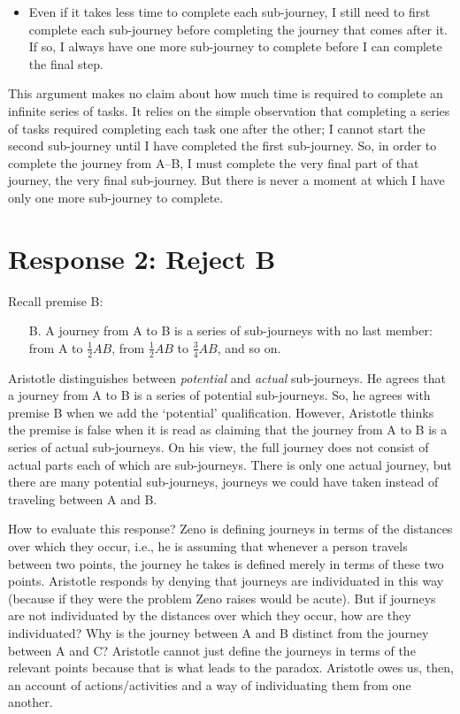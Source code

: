 \documentclass[oneside]{article}
\begin{document}
\begin{itemize}
\itemsep1pt\parskip0pt
\item
  Even if it takes less time to complete each sub-journey, I still need
  to first complete each sub-journey before completing the journey that
  comes after it. If so, I always have one more sub-journey to complete
  before I can complete the final step.
\end{itemize}
This argument makes no claim about how much time is required to complete an infinite series of tasks. It relies on the simple observation that completing a series of tasks required completing each task one after the other; I cannot start the second sub-journey until I have completed the first sub-journey. So, in order to complete the journey from A--B, I must complete the very final part of that journey, the very final sub-journey. But there is never a moment at which I have only one more sub-journey to complete. 

\section{Response 2: Reject B}

Recall premise B: 
\begin{enumerate}
\item[B.]  A journey from A to B is a series of sub-journeys with no last member:
  from A to \(\frac{1}{2}AB\), from \(\frac{1}{2}AB\) to
  \(\frac{3}{4}AB\), and so on.
  \end{enumerate}
Aristotle distinguishes between \emph{potential} and \emph{actual} sub-journeys. He agrees that a journey from A to B is a series of potential sub-journeys. So, he agrees with premise B when we add the `potential' qualification. However, Aristotle thinks the premise is false when it is read as claiming that the journey from A to B is a series of actual sub-journeys. On his view, the full journey does not consist of actual parts each of which are sub-journeys. There is only one actual journey, but there are many potential sub-journeys, journeys we could have taken instead of traveling between A and  B. 

How to evaluate this response? Zeno is defining journeys in terms of the distances over which they occur, i.e., he is assuming that whenever a person travels between two points, the journey he takes is defined merely in terms of these two points. Aristotle responds by denying that journeys are individuated in this way (because if they were the problem Zeno raises would be acute). But if journeys are not individuated by the distances over which they occur, how are they individuated? Why is the journey between A and B distinct from the journey between A and C? Aristotle cannot just define the journeys in terms of the relevant points because that is what leads to the paradox. Aristotle owes us, then, an account of actions/activities and a way of individuating them from one another. 
\end{document}

